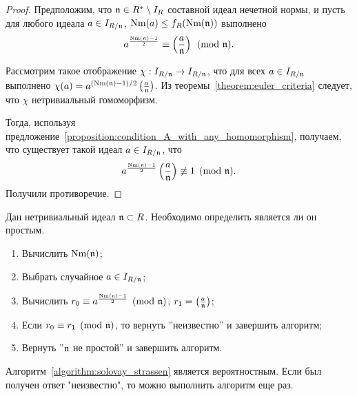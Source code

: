 \documentclass[_00_dissertation.tex]{subfiles}
\begin{document}
\begin{proof}
    Предположим, что $\mathfrak{n} \in R^{*} \setminus I_{R}$ составной идеал нечетной нормы, и пусть для любого идеала $a \in I_{R/\mathfrak{n}}$, $\textrm{Nm}(a) \le f_R(\textrm{Nm}(\mathfrak{n}))$ выполнено
    \begin{equation*}
        a^{\frac{\textrm{Nm}(\mathfrak{n}) - 1}{2}} \equiv \left(\frac{a}{\mathfrak{n}}\right) \pmod{\mathfrak{n}}.
    \end{equation*}
    
    Рассмотрим такое отображение $\chi: I_{R/\mathfrak{n}} \to I_{R/\mathfrak{n}}$, что для всех $a \in I_{R/\mathfrak{n}}$ выполнено $\chi(a) = a^{(\textrm{Nm}(\mathfrak{n}) - 1)/2}\left(\frac{a}{\mathfrak{n}}\right)$.
    Из теоремы~\ref{theorem:euler_criteria} следует, что $\chi$ нетривиальный гомоморфизм.
    
    Тогда, используя предложение~\ref{proposition:condition_A_with_any_homomorphism}, получаем, что существует такой идеал $a \in I_{R/\mathfrak{n}}$, что
    \begin{equation*}
        a^{\frac{\textrm{Nm}(\mathfrak{n}) - 1}{2}} \left(\frac{a}{\mathfrak{n}}\right) \not\equiv 1 \pmod{\mathfrak{n}}.
    \end{equation*}
    Получили противоречие.
\end{proof}

\begin{algorithm}\label{algorithm:solovay_strassen}
    Дан нетривиальный идеал $\mathfrak{n} \subset R$.
    Необходимо определить является ли он простым.

    \begin{enumerate}
        \item Вычислить $\textrm{Nm}(\mathfrak{n})$;
        
        \item Выбрать случайное $a \in I_{R/\mathfrak{n}}$;

        \item Вычислить $r_0 \equiv a^{\frac{\textrm{Nm}(\mathfrak{n}) - 1}{2}} \pmod{\mathfrak{n}}$, $r_1 = \left(\frac{a}{\mathfrak{n}}\right)$;

        \item Если $r_0 \equiv r_1 \pmod{\mathfrak{n}}$, то вернуть ''неизвестно'' и завершить алгоритм;

        \item Вернуть ''$\mathfrak{n}$ не простой'' и завершить алгоритм.
    \end{enumerate}
\end{algorithm}

\begin{remark}
    Алгоритм~\ref{algorithm:solovay_strassen} является вероятностным.
    Если был получен ответ "неизвестно", то можно выполнить алгоритм еще раз.
\end{remark}
\end{document}
